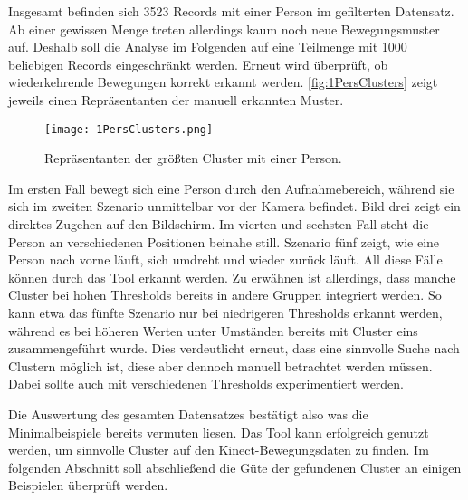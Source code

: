 Insgesamt befinden sich 3523 Records mit einer Person im gefilterten Datensatz.
Ab einer gewissen Menge treten allerdings kaum noch neue Bewegungsmuster auf.
Deshalb soll die Analyse im Folgenden auf eine Teilmenge mit 1000 beliebigen Records eingeschränkt werden.
Erneut wird überprüft, ob wiederkehrende Bewegungen korrekt erkannt werden.
\autoref{fig:1PersClusters} zeigt jeweils einen Repräsentanten der manuell erkannten Muster.
\begin{figure}[ht]
    \begin{center}
    \texttt{[image: 1PersClusters.png]}
    \end{center}
    \caption{Repräsentanten der größten Cluster mit einer Person.}
    \label{fig:1PersClusters}
\end{figure}
Im ersten Fall bewegt sich eine Person durch den Aufnahmebereich,
während sie sich im zweiten Szenario unmittelbar vor der Kamera befindet.
Bild drei zeigt ein direktes Zugehen auf den Bildschirm.
Im vierten und sechsten Fall steht die Person an verschiedenen Positionen beinahe still.
Szenario fünf zeigt, wie eine Person nach vorne läuft,
sich umdreht und wieder zurück läuft.
All diese Fälle können durch das Tool erkannt werden.
Zu erwähnen ist allerdings, dass manche Cluster bei hohen Thresholds bereits in andere Gruppen integriert werden.
So kann etwa das fünfte Szenario nur bei niedrigeren Thresholds erkannt werden,
während es bei höheren Werten unter Umständen bereits mit Cluster eins zusammengeführt wurde.
Dies verdeutlicht erneut, dass eine sinnvolle Suche nach Clustern möglich ist,
diese aber dennoch manuell betrachtet werden müssen.
Dabei sollte auch mit verschiedenen Thresholds experimentiert werden.

Die Auswertung des gesamten Datensatzes bestätigt also was die Minimalbeispiele bereits vermuten liesen.
Das Tool kann erfolgreich genutzt werden, um sinnvolle Cluster auf den Kinect-Bewegungsdaten zu finden.
Im folgenden Abschnitt soll abschließend die Güte der gefundenen Cluster an einigen Beispielen
überprüft werden.

